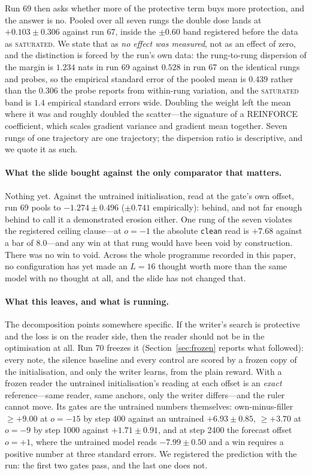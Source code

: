 \documentclass{article} %
\begin{document}
Run 69 then asks whether more of the protective term buys more protection, and the answer is no.
Pooled over all seven rungs the double dose lands at $+0.103 \pm 0.306$ against run 67, inside the
$\pm 0.60$ band registered before the data as \textsc{saturated}. We state that as \emph{no effect
was measured}, not as an effect of zero, and the distinction is forced by the run's own data: the
rung-to-rung dispersion of the margin is $1.234$ nats in run 69 against $0.528$ in run 67 on the
identical rungs and probes, so the empirical standard error of the pooled mean is $0.439$ rather than
the $0.306$ the probe reports from within-rung variation, and the \textsc{saturated} band is $1.4$
empirical standard errors wide. Doubling the weight left the mean where it was and roughly doubled
the scatter---the signature of a REINFORCE coefficient, which scales gradient variance and gradient
mean together. Seven rungs of one trajectory are one trajectory; the dispersion ratio is descriptive,
and we quote it as such.

\paragraph{What the slide bought against the only comparator that matters.} Nothing yet. Against the
untrained initialisation, read at the gate's own offset, run 69 pools to $-1.274 \pm 0.496$
($\pm 0.741$ empirically): behind, and not far enough behind to call it a demonstrated erosion
either. One rung of the seven violates the registered ceiling clause---at $o = -1$ the absolute
\texttt{clean} read is $+7.68$ against a bar of $8.0$---and any win at that rung would have been void
by construction. There was no win to void. Across the whole programme recorded in this paper, no
configuration has yet made an $L{=}16$ thought worth more than the same model with no thought at all,
and the slide has not changed that.

\paragraph{What this leaves, and what is running.} The decomposition points somewhere specific. If
the writer's search is protective and the loss is on the reader side, then the reader should not be in
the optimisation at all. Run 70 freezes it (Section~\ref{sec:frozen} reports what followed): every note, the silence baseline
and every control are scored by a frozen copy of the initialisation, and only the writer learns, from
the plain reward. With a frozen reader the untrained initialisation's reading at each offset is an
\emph{exact} reference---same reader, same anchors, only the writer differs---and the ruler cannot
move. Its gates are the untrained numbers themselves: own-minus-filler $\ge +9.00$ at $o = -15$ by
step 400 against an untrained $+6.93 \pm 0.85$, $\ge +3.70$ at $o = -9$ by step 1000 against
$+1.71 \pm 0.91$, and at step 2400 the forecast offset $o = +1$, where the untrained model reads
$-7.99 \pm 0.50$ and a win requires a positive number at three standard errors. We registered the
prediction with the run: the first two gates pass, and the last one does not.
\end{document}

